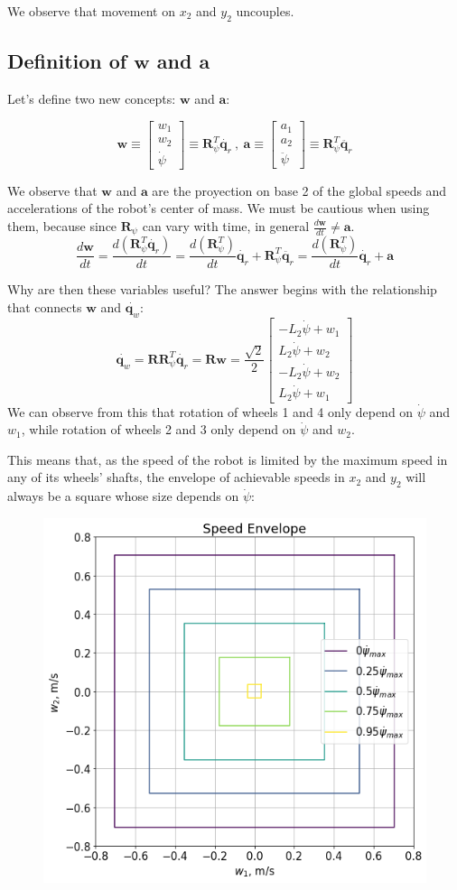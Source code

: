 \documentclass[12pt]{article}
\renewcommand{\vec}[1]{\bm{#1}}
\newcommand{\R}{\mathbb R}
\newcommand{\w}{\dot\varphi}
\def\R{\vec R}
\def\q{\vec q}
\begin{document}
We observe that movement on $x_2$ and $y_2$ uncouples.

\subsection{Definition of $\vec{w}$ and $\vec{a}$ }

Let's define two new concepts: $\vec{w}$ and $\vec{a}$:

$$ \vec{w} \equiv \left[\begin{matrix} w_1\\w_2\\\dot{\psi}\end{matrix}\right] \equiv \R_{\psi}^T \dot{\q_r}\ ,\ \vec{a} \equiv \left[\begin{matrix} a_1\\a_2\\\ddot{\psi}\end{matrix}\right] \equiv \R_{\psi}^T \ddot{\q_r}$$

We observe that  $\vec{w}$ and $\vec{a}$ are the proyection on base 2 of the global speeds and accelerations of the robot's center of mass. We must be cautious when using them, because since $\R_{\psi}$ can vary with time, in general $\frac{d\vec{w}}{dt}\neq\vec{a}$.
$$\frac{d\vec{w}}{dt} = \frac{d(\R_{\psi}^T \dot{\q_r})}{dt} =  \frac{d(\R_{\psi}^T)}{dt}\dot{\q_r} + \R_{\psi}^T \ddot{\q_r}=  \frac{d(\R_{\psi}^T)}{dt}\dot{\q_r} + \vec{a}$$

Why are then these variables useful? The answer begins with the relationship that connects  $\vec{w}$ and $\dot{\q_w}$:
$$\dot{\q_w} = \R \R_{\psi}^T \dot{\q_r} = \R \vec{w} = \frac{\sqrt{2}}{2}\left[\begin{matrix}- L_{2} \dot{\psi} + w_1\\L_{2} \dot{\psi} + w_2\\- L_{2} \dot{\psi} + w_2\\L_{2} \dot{\psi} + w_1\end{matrix}\right]$$
We can observe from this that rotation of wheels 1 and 4 only depend on $\dot{\psi}$ and $w_1$, while rotation of wheels 2 and 3 only depend on $\dot{\psi}$ and $w_2$.

This means that, as the speed of the robot is limited by the maximum speed in any of its wheels' shafts, the envelope of achievable speeds in $x_2$ and $y_2$ will always be a square whose size depends on $\dot{\psi}$:
\begin{figure}[h]
	\centering
	\includegraphics[width=.5\linewidth]{speed_envelope}
	\label{fig:speed_envelope}
\end{figure}
\end{document}
